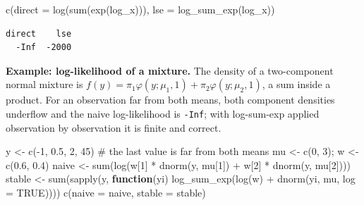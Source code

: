 \documentclass[
  letterpaper,
  DIV=11,
  numbers=noendperiod]{scrreprt}
\newenvironment{Shaded}{\begin{snugshade}}{\end{snugshade}}
\newcommand{\AttributeTok}[1]{\textcolor[rgb]{0.40,0.45,0.13}{#1}}
\newcommand{\CommentTok}[1]{\textcolor[rgb]{0.37,0.37,0.37}{#1}}
\newcommand{\ConstantTok}[1]{\textcolor[rgb]{0.56,0.35,0.01}{#1}}
\newcommand{\ControlFlowTok}[1]{\textcolor[rgb]{0.00,0.23,0.31}{\textbf{#1}}}
\newcommand{\DecValTok}[1]{\textcolor[rgb]{0.68,0.00,0.00}{#1}}
\newcommand{\FloatTok}[1]{\textcolor[rgb]{0.68,0.00,0.00}{#1}}
\newcommand{\FunctionTok}[1]{\textcolor[rgb]{0.28,0.35,0.67}{#1}}
\newcommand{\NormalTok}[1]{\textcolor[rgb]{0.00,0.23,0.31}{#1}}
\newcommand{\OtherTok}[1]{\textcolor[rgb]{0.00,0.23,0.31}{#1}}
\newcommand{\SpecialCharTok}[1]{\textcolor[rgb]{0.37,0.37,0.37}{#1}}
\begin{document}
\begin{Shaded}
\begin{Highlighting}[]
\FunctionTok{c}\NormalTok{(}\AttributeTok{direct =} \FunctionTok{log}\NormalTok{(}\FunctionTok{sum}\NormalTok{(}\FunctionTok{exp}\NormalTok{(log\_x))), }\AttributeTok{lse =} \FunctionTok{log\_sum\_exp}\NormalTok{(log\_x))}
\end{Highlighting}
\end{Shaded}

\begin{verbatim}
direct    lse 
  -Inf  -2000 
\end{verbatim}

\textbf{Example: log-likelihood of a mixture.} The density of a
two-component normal mixture is
\(f(y) = \pi_1\varphi(y;\mu_1,1) + \pi_2\varphi(y;\mu_2,1)\), a sum
inside a product. For an observation far from both means, both component
densities underflow and the naive log-likelihood is \texttt{-Inf}; with
log-sum-exp applied observation by observation it is finite and correct.

\begin{Shaded}
\begin{Highlighting}[]
\NormalTok{y }\OtherTok{\textless{}{-}} \FunctionTok{c}\NormalTok{(}\SpecialCharTok{{-}}\DecValTok{1}\NormalTok{, }\FloatTok{0.5}\NormalTok{, }\DecValTok{2}\NormalTok{, }\DecValTok{45}\NormalTok{)                      }\CommentTok{\# the last value is far from both means}
\NormalTok{mu }\OtherTok{\textless{}{-}} \FunctionTok{c}\NormalTok{(}\DecValTok{0}\NormalTok{, }\DecValTok{3}\NormalTok{); w }\OtherTok{\textless{}{-}} \FunctionTok{c}\NormalTok{(}\FloatTok{0.6}\NormalTok{, }\FloatTok{0.4}\NormalTok{)}
\NormalTok{naive }\OtherTok{\textless{}{-}} \FunctionTok{sum}\NormalTok{(}\FunctionTok{log}\NormalTok{(w[}\DecValTok{1}\NormalTok{] }\SpecialCharTok{*} \FunctionTok{dnorm}\NormalTok{(y, mu[}\DecValTok{1}\NormalTok{]) }\SpecialCharTok{+}\NormalTok{ w[}\DecValTok{2}\NormalTok{] }\SpecialCharTok{*} \FunctionTok{dnorm}\NormalTok{(y, mu[}\DecValTok{2}\NormalTok{])))}
\NormalTok{stable }\OtherTok{\textless{}{-}} \FunctionTok{sum}\NormalTok{(}\FunctionTok{sapply}\NormalTok{(y, }\ControlFlowTok{function}\NormalTok{(yi) }\FunctionTok{log\_sum\_exp}\NormalTok{(}\FunctionTok{log}\NormalTok{(w) }\SpecialCharTok{+} \FunctionTok{dnorm}\NormalTok{(yi, mu, }\AttributeTok{log =} \ConstantTok{TRUE}\NormalTok{))))}
\FunctionTok{c}\NormalTok{(}\AttributeTok{naive =}\NormalTok{ naive, }\AttributeTok{stable =}\NormalTok{ stable)}
\end{Highlighting}
\end{Shaded}
\end{document}
